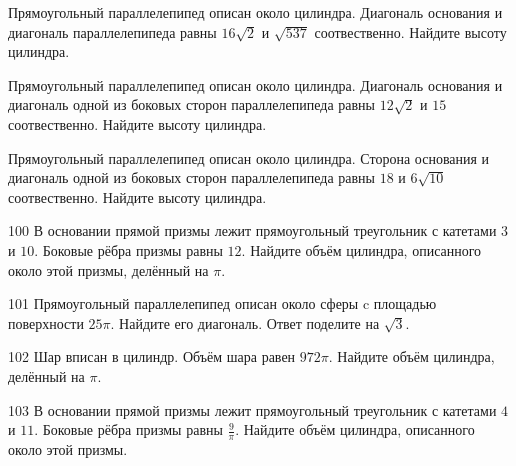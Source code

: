 \documentclass[4apaper]{article}
\begin{document}
\begin{taskBN}{97}
Прямоугольный параллелепипед описан около цилиндра. Диагональ основания и диагональ параллелепипеда равны $16\sqrt{2}$ и $\sqrt{537}$ соотвественно. Найдите высоту цилиндра.
\end{taskBN}

\begin{taskBN}{98}
Прямоугольный параллелепипед описан около цилиндра. Диагональ основания и диагональ одной из боковых сторон параллелепипеда равны $12\sqrt{2}$ и $15$ соотвественно. Найдите высоту цилиндра.
\end{taskBN}

\begin{taskBN}{99}
Прямоугольный параллелепипед описан около цилиндра. Сторона основания и диагональ одной из боковых сторон параллелепипеда равны $18$ и $6\sqrt{10}$ соотвественно. Найдите высоту цилиндра.
\end{taskBN}

\begin{taskBN}{100}
В основании прямой призмы лежит прямоугольный треугольник с катетами $3$ и $10$. Боковые рёбра призмы равны $12$. Найдите объём цилиндра, описанного около этой призмы, делённый на $\pi$.
\end{taskBN}

\begin{taskBN}{101}
Прямоугольный параллелепипед описан около сферы c площадью поверхности $25$$\pi$. Найдите его диагональ. Ответ поделите на $\sqrt{3}$.
\end{taskBN}

\begin{taskBN}{102}
Шар вписан в цилиндр. Объём шара равен $972\pi$. Найдите объём цилиндра, делённый на $\pi$.
\end{taskBN}

\begin{taskBN}{103}
В основании прямой призмы лежит прямоугольный треугольник с катетами $4$ и $11$. Боковые рёбра призмы равны $\frac{9}{\pi}$. Найдите объём цилиндра, описанного около этой призмы.
\end{taskBN}
\end{document}
